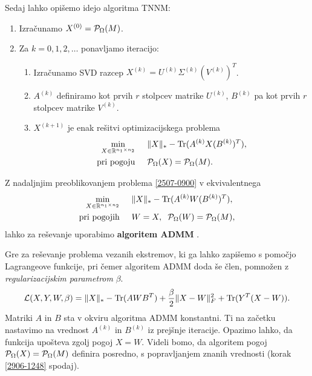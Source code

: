 Sedaj lahko opišemo idejo algoritma TNNM:
\begin{enumerate}
    \item Izračunamo $X^{(0)} = \mathcal{P}_\Omega(M)$.
    \item Za $k=0,1,2,\ldots$ ponavljamo iteracijo:
          \begin{enumerate}
              \item Izračunamo SVD razcep
                    $X^{(k)} = U^{(k)} \Sigma^{(k)} (V^{(k)})^T$.
              \item $A^{(k)}$ definiramo kot prvih    $r$ stolpcev matrike $U^{(k)}$,
                    $B^{(k)}$ pa kot prvih
                    $r$ stolpcev matrike $V^{(k)}$.
              \item $X^{(k+1)}$ je enak rešitvi
                    optimizacijskega problema
                    \begin{align}
                        \label{2507-0900}
                        \begin{split}
                            \min_{X\in  \mathbb{R}^{n_1 \times n_2}} \hspace{0.5cm}         & \lVert X\rVert_* - \operatorname{Tr}(A^{(k)}X(B^{(k)})^T), \\
                            \text{pri pogoju} \hspace{0.5cm} & \mathcal{P}_\Omega(X) = \mathcal{P}_\Omega(M).
                        \end{split}
                    \end{align}
          \end{enumerate}
\end{enumerate}
Z nadaljnjim preoblikovanjem problema
\eqref{2507-0900} v ekvivalentnega
\begin{align}
    \label{1307-1527}
    \begin{split}
        \min_{X\in  \mathbb{R}^{n_1 \times n_2}}  \hspace{0.5cm}         & \lVert X\rVert_* - \operatorname{Tr}(A^{(k)}W(B^{(k)})^T),  \\
        \text{pri pogojih} \hspace{0.5cm} & W=X, \hspace{0.2cm} \mathcal{P}_\Omega(W) = \mathcal{P}_\Omega(M),
    \end{split}
\end{align}
lahko za reševanje uporabimo \textbf{algoritem ADMM} \cite{TNNM-HZYLH12}.

Gre za reševanje problema vezanih ekstremov, ki ga lahko zapišemo s pomočjo Lagrangeove funkcije, pri čemer algoritem ADMM doda še
člen, pomnožen z \textit{regularizacijskim parametrom} $\beta$.
\[
    \mathcal{L}(X, Y, W, \beta) = \lVert X\rVert_* - \operatorname{Tr}(A W B^T) + \frac{\beta}{2} \lVert X - W\rVert_F^2 + \operatorname{Tr}(Y^T(X-W)).
\]
Matriki $A$ in $B$ sta v okviru algoritma ADMM konstantni. Ti na začetku nastavimo na vrednost $A^{(k)}$ in $B^{(k)}$ iz prejšnje iteracije. Opazimo lahko, da funkcija upošteva zgolj pogoj $X = W$. Videli bomo, da algoritem pogoj $\mathcal{P}_\Omega(X) = \mathcal{P}_\Omega(M)$ definira posredno, s popravljanjem znanih vrednosti (korak \eqref{2906-1248} spodaj).%

